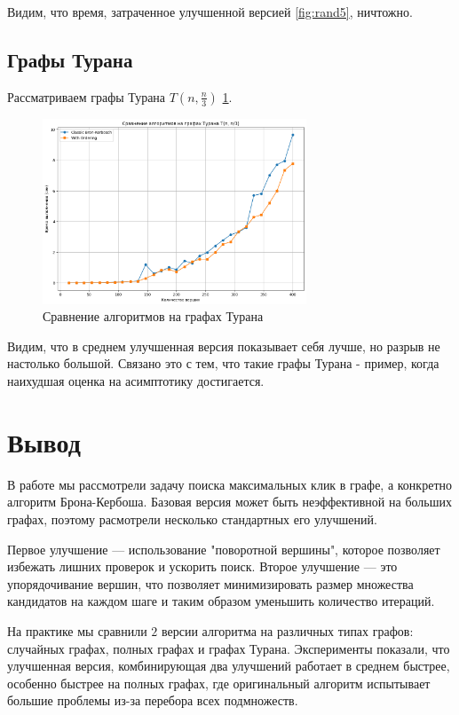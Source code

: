 \documentclass{article}
\begin{document}
Видим, что время, затраченное улучшенной версией \ref{fig:rand5}, ничтожно.

\subsection{Графы Турана}
Рассматриваем графы Турана $T(n, \frac{n}{3})$ \ref{fig:rand6}.

\begin{figure}[htbp]
  \centering
  \includegraphics[width=0.7\textwidth]{image/turan.png}
  \caption{Сравнение алгоритмов на графах Турана}
  \label{fig:rand6}
\end{figure}
\newline
Видим, что в среднем улучшенная версия показывает себя лучше, но разрыв не настолько большой. Связано это с тем, что такие графы Турана - пример, когда наихудшая оценка на асимптотику достигается.
\newpage
\section{Вывод}
В работе мы рассмотрели задачу поиска максимальных клик в графе, а конкретно алгоритм Брона-Кербоша. Базовая версия может быть неэффективной на больших графах, поэтому расмотрели несколько стандартных его улучшений.

Первое улучшение — использование "поворотной вершины", которое позволяет избежать лишних проверок и ускорить поиск. Второе улучшение — это упорядочивание вершин, что позволяет минимизировать размер множества кандидатов на каждом шаге и таким образом уменьшить количество итераций.

На практике мы сравнили $2$ версии алгоритма на различных типах графов: случайных графах, полных графах и графах Турана. Эксперименты показали, что улучшенная версия, комбинирующая два улучшений работает в среднем быстрее, особенно быстрее на полных графах, где оригинальный алгоритм испытывает большие проблемы из-за перебора всех подмножеств.
\end{document}
